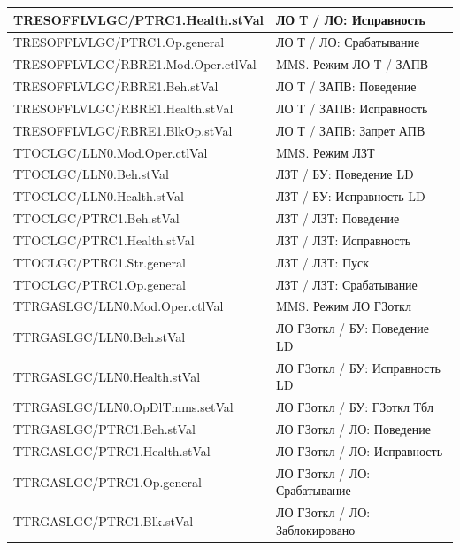 \begin{longtable}{|>{\raggedright\arraybackslash}m{}|>{\raggedright\arraybackslash}m{}|}
\hline
TRESOFFLVLGC/PTRC1.Health.stVal & ЛО Т / ЛО: Исправность \\
\hline
TRESOFFLVLGC/PTRC1.Op.general & ЛО Т / ЛО: Срабатывание \\
\hline
TRESOFFLVLGC/RBRE1.Mod.Oper.ctlVal & MMS. Режим ЛО Т / ЗАПВ \\
\hline
TRESOFFLVLGC/RBRE1.Beh.stVal & ЛО Т / ЗАПВ: Поведение \\
\hline
TRESOFFLVLGC/RBRE1.Health.stVal & ЛО Т / ЗАПВ: Исправность \\
\hline
TRESOFFLVLGC/RBRE1.BlkOp.stVal & ЛО Т / ЗАПВ: Запрет АПВ \\
\hline
TTOCLGC/LLN0.Mod.Oper.ctlVal & MMS. Режим ЛЗТ \\
\hline
TTOCLGC/LLN0.Beh.stVal & ЛЗТ / БУ: Поведение LD \\
\hline
TTOCLGC/LLN0.Health.stVal & ЛЗТ / БУ: Исправность LD \\
\hline
TTOCLGC/PTRC1.Beh.stVal & ЛЗТ / ЛЗТ: Поведение \\
\hline
TTOCLGC/PTRC1.Health.stVal & ЛЗТ / ЛЗТ: Исправность \\
\hline
TTOCLGC/PTRC1.Str.general & ЛЗТ / ЛЗТ: Пуск \\
\hline
TTOCLGC/PTRC1.Op.general & ЛЗТ / ЛЗТ: Срабатывание \\
\hline
TTRGASLGC/LLN0.Mod.Oper.ctlVal & MMS. Режим ЛО ГЗоткл \\
\hline
TTRGASLGC/LLN0.Beh.stVal & ЛО ГЗоткл / БУ: Поведение LD \\
\hline
TTRGASLGC/LLN0.Health.stVal & ЛО ГЗоткл / БУ: Исправность LD \\
\hline
TTRGASLGC/LLN0.OpDlTmms.setVal & ЛО ГЗоткл / БУ: ГЗоткл Тбл \\
\hline
TTRGASLGC/PTRC1.Beh.stVal & ЛО ГЗоткл / ЛО: Поведение \\
\hline
TTRGASLGC/PTRC1.Health.stVal & ЛО ГЗоткл / ЛО: Исправность \\
\hline
TTRGASLGC/PTRC1.Op.general & ЛО ГЗоткл / ЛО: Срабатывание \\
\hline
TTRGASLGC/PTRC1.Blk.stVal & ЛО ГЗоткл / ЛО: Заблокировано \\
\hline
\end{longtable}
